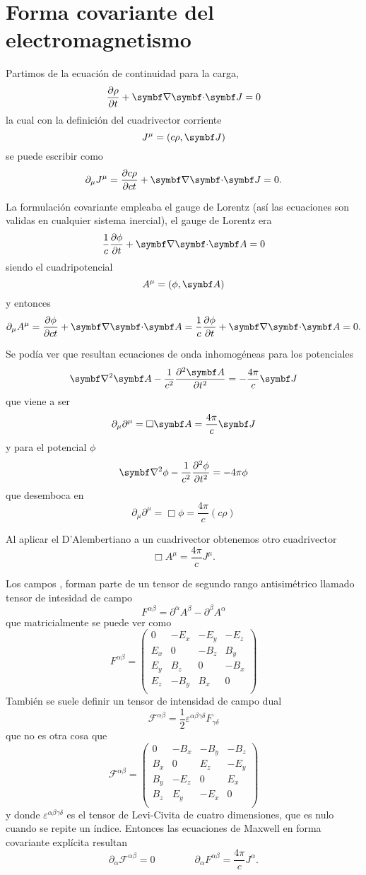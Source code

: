 \documentclass[10pt,oneside]{CBFT_book}
\begin{document}
\section{Forma covariante del electromagnetismo}

Partimos de la ecuación de continuidad para la carga,
\[
	\dpar{\rho}{t} + \divem{J} = 0
\]
la cual con la definición del cuadrivector corriente
\[
	J^\mu = ( c\rho , \vb{J} )
\]
se puede escribir como 
\[
	\partial_\mu J^\mu = \dpar{c\rho}{ct} + \divem{J} = 0 .
\]

La formulación covariante empleaba el gauge de Lorentz (así las ecuaciones son validas en cualquier sistema
inercial), el gauge de Lorentz era
\[
	\frac{1}{c} \dpar{\phi}{t} + \divem{A} = 0
\]
siendo el cuadripotencial
\[
	A^\mu = ( \phi , \vb{A} ) 
\]
y entonces 
\[
	\partial_\mu A^\mu = \dpar{\phi}{ct} + \divem{A} = \frac{1}{c} \dpar{\phi}{t} + \divem{A} = 0 .
\]

Se podía ver que resultan ecuaciones de onda inhomogéneas para los potenciales
\[
	\Nabla^2 \vb{A} - \frac{1}{c^2} \dpar[2]{\vb{A}}{t} = -\frac{4\pi}{c} \vb{J}
\]
que viene a ser 
\[
	\partial_\mu\partial^\mu = \Box \vb{A} = \frac{4\pi}{c} \vb{J}
\]
y para el potencial $\phi$
\[
	\Nabla^2 \phi - \frac{1}{c^2} \dpar[2]{\phi}{t} = - 4\pi \phi
\]
que desemboca en 
\[
	\partial_\mu\partial^\mu = \Box \phi = \frac{4\pi}{c} ( c\rho )
\]

Al aplicar el D'Alembertiano a un cuadrivector obtenemos otro cuadrivector 
\[
	\Box A^\mu = \frac{4\pi}{c} J^\mu.
\]

Los campos ,  forman parte de un tensor de segundo rango antisimétrico llamado tensor
de intesidad de campo 
\[
	F^{\alpha\beta} = \partial^\alpha A^\beta - \partial^\beta A^\alpha
\]
que matricialmente se puede ver como 
\[
	F^{\alpha\beta} =
	\begin{pmatrix}
	 0 & -E_x & -E_y & -E_z \\
	 E_x & 0 & -B_z & B_y \\
	 E_y & B_z & 0 & -B_x \\
	 E_z & -B_y & B_x & 0 \\
	\end{pmatrix}
\]
También se suele definir un tensor de intensidad de campo dual
\[
	\mathcal{F}^{\alpha\beta} =  \frac{1}{2} \varepsilon^{\alpha\beta\gamma\delta} F_{\gamma\delta}
\]
que no es otra cosa que 
\[
	\mathcal{F}^{\alpha\beta}=
	\begin{pmatrix}
	 0 & -B_x & -B_y & -B_z \\
	 B_x & 0 & E_z & -E_y \\
	 B_y & -E_z & 0 & E_x \\
	 B_z & E_y & -E_x & 0 \\
	\end{pmatrix}
\]
y donde $\varepsilon^{\alpha\beta\gamma\delta}$ es el tensor de Levi-Civita de cuatro dimensiones, que es nulo
cuando se repite un índice.
Entonces las ecuaciones de Maxwell en forma covariante explícita resultan 
\[
	\partial_\alpha \mathcal{F}^{\alpha\beta} =  0 \qquad \qquad 
	\partial_\alpha F^{\alpha\beta} =  \frac{4 \pi}{c} J^\alpha.
\]
\end{document}
